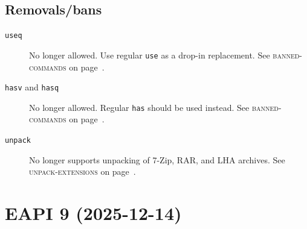 \documentclass[a4paper,nofoldmark]{leaflet}
\newcommand{\code}[1]{\texttt{#1}}
\newcommand{\featureref}[1]{\textsc{#1} on page~\pageref{feat:#1}}
\begin{document}
\subsection{Removals/bans}
\label{sec:cs:eapi8-removalsbans}
\begin{description}
    \item[\code{useq}] No longer allowed. Use regular \code{use} as
    a drop-in replacement. See \featureref{banned-commands}.
    \item[\code{hasv} and \code{hasq}] No longer allowed. Regular
    \code{has} should be used instead.
    See \featureref{banned-commands}.
    \item[\code{unpack}] No longer supports unpacking of 7-Zip, RAR,
    and LHA archives. See \featureref{unpack-extensions}.
\end{description}

\section{EAPI 9 (2025-12-14)}
\label{sec:cs:eapi9}
\end{document}
